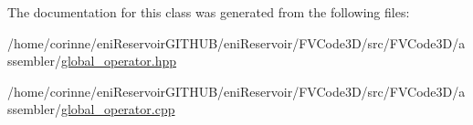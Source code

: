 The documentation for this class was generated from the following files\+:\begin{DoxyCompactItemize}
\item 
/home/corinne/eni\+Reservoir\+G\+I\+T\+H\+U\+B/eni\+Reservoir/\+F\+V\+Code3\+D/src/\+F\+V\+Code3\+D/assembler/\hyperlink{global__operator_8hpp}{global\+\_\+operator.\+hpp}\item 
/home/corinne/eni\+Reservoir\+G\+I\+T\+H\+U\+B/eni\+Reservoir/\+F\+V\+Code3\+D/src/\+F\+V\+Code3\+D/assembler/\hyperlink{global__operator_8cpp}{global\+\_\+operator.\+cpp}\end{DoxyCompactItemize}
